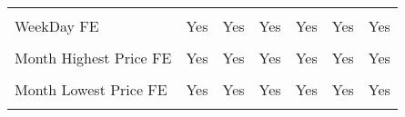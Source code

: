\documentclass[border=0.2cm]{standalone}
\begin{document}
\begin{tabular}{lcccccc}
    \vspace{4pt}           &                                                &                                                &                                                &                                                &                                                &                                                \\
    WeekDay FE             & Yes                                            & Yes                                            & Yes                                            & Yes                                            & Yes                                            & Yes                                            \\
    \vspace{4pt}           &                                                &                                                &                                                &                                                &                                                &                                                \\
    Month Highest Price FE & Yes                                            & Yes                                            & Yes                                            & Yes                                            & Yes                                            & Yes                                            \\
    \vspace{4pt}           &                                                &                                                &                                                &                                                &                                                &                                                \\
    Month Lowest Price FE  & Yes                                            & Yes                                            & Yes                                            & Yes                                            & Yes                                            & Yes                                            \\
    \vspace{4pt}           &                                                &                                                &                                                &                                                &                                                &                                                \\

\end{tabular}
\end{document}
